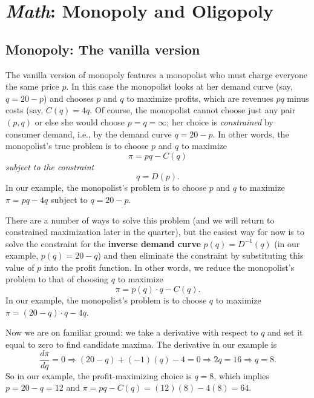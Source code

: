 \chapter{\emph{Math}: Monopoly and Oligopoly}
\label{4duopoly}

\section{Monopoly: The vanilla version} %

The vanilla version of monopoly features a monopolist who must charge everyone the same price $p$. In this case the monopolist looks at her demand curve (say, $q=20-p$) and chooses $p$ and $q$ to maximize profits, which are revenues $pq$ minus costs (say, $C(q)=4q$. Of course, the monopolist cannot choose just any pair $(p,q)$ or else she would choose $p=q=\infty$; her choice is \emph{constrained} by consumer demand, i.e., by the demand curve $q=20-p$. In other words, the monopolist's true problem is to choose $p$ and $q$ to maximize
\[
\pi=pq-C(q)
\]
\emph{subject to the constraint}
\[
q=D(p).
\]
In our example, the monopolist's problem is to choose $p$ and $q$ to maximize $\pi=pq-4q$ subject to $q=20-p$.

There are a number of ways to solve this problem (and we will return to constrained maximization later in the quarter), but the easiest way for now is to solve the constraint for the \textbf{inverse demand curve} $p(q)=D^{-1}(q)$ (in our example, $p(q)=20-q$) and then eliminate the constraint by substituting this value of $p$ into the profit function. In other words, we reduce the monopolist's problem to that of choosing $q$ to maximize
\[
\pi=p(q)\cdot q - C(q).
\]
In our example, the monopolist's problem is to choose $q$ to maximize $\pi=(20-q)\cdot q - 4q$.

Now we are on familiar ground: we take a derivative with respect to $q$ and set it equal to zero to find candidate maxima. The derivative in our example is
\[
\frac{d\pi}{dq}=0\Longrightarrow (20-q)+(-1)(q) - 4 = 0\Longrightarrow 2q=16\Longrightarrow q=8.
\]
So in our example, the profit-maximizing choice is $q=8$, which implies $p=20-q=12$ and $\pi=pq-C(q)=(12)(8)-4(8)=64.$

